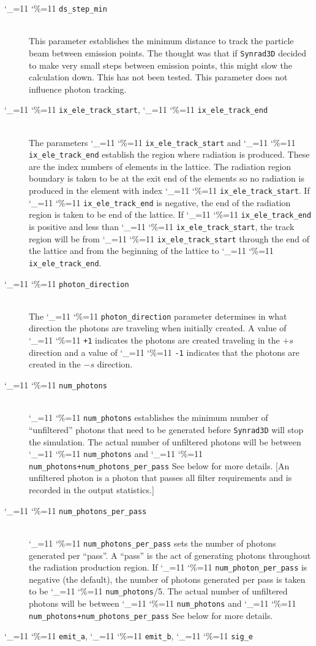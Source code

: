 \documentclass[11pt,openany]{report}
\newcommand{\srthree}{\texttt{Synrad3D}\xspace}
\newcommand\ttcmd{\begingroup\catcode`\_=11 \catcode`\%=11 \dottcmd}
\newcommand\dottcmd[1]{\texttt{#1}\endgroup}
\newcommand{\vn}{\ttcmd}
\newcommand{\Newline}{\hfil \\}
\begin{document}
  \begin{description}
  \item[\vn{ds_step_min}] \Newline
This parameter establishes the minimum distance to track the particle beam between emission
points. The thought was that if \srthree decided to make very small steps  between emission
points, this might slow the calculation down. This has not been tested. This parameter
does not influence photon tracking.
  \item[\vn{ix_ele_track_start}, \vn{ix_ele_track_end}] \Newline
The parameters \vn{ix_ele_track_start} and \vn{ix_ele_track_end} establish
the region where radiation is produced. These are the index numbers of 
elements in the lattice. The radiation region boundary is taken to be at
the exit end of the elements so no radiation is produced in the element
with index \vn{ix_ele_track_start}. If \vn{ix_ele_track_end} is negative,
the end of the radiation region is taken to be end of the lattice.
If \vn{ix_ele_track_end} is positive and less than \vn{ix_ele_track_start},
the track region will be from \vn{ix_ele_track_start} through the
end of the lattice and from the beginning of the lattice to \vn{ix_ele_track_end}.
  \item[\vn{photon_direction}] \Newline
The \vn{photon_direction} parameter determines in what direction the photons
are traveling when initially created. A value of \vn{+1} indicates the photons
are created traveling in the $+s$ direction and a value of \vn{-1} indicates
that the photons are created in the $-s$ direction.
  \item[\vn{num_photons}] \Newline
\vn{num_photons} establishes the minimum number of ``unfiltered''
photons that need to be generated before \srthree will stop the
simulation. The actual number of unfiltered photons will be between
\vn{num_photons} and \vn{num_photons+num_photons_per_pass} See
below for more details. [An unfiltered photon is a photon that passes
all filter requirements and is recorded in the output statistics.]
  \item[\vn{num_photons_per_pass}] \Newline
\vn{num_photons_per_pass} sets the number of photons generated per
``pass''.  A ``pass'' is the act of generating photons throughout the
radiation production region. If \vn{num_photon_per_pass} is negative
(the default), the number of photons generated per pass is taken
to be \vn{num_photons}/5. The actual number of unfiltered photons will be between
\vn{num_photons} and \vn{num_photons+num_photons_per_pass} See
below for more details.
  \item[\vn{emit_a}, \vn{emit_b}, \vn{sig_e}] \Newline

\end{description}
\end{document}
